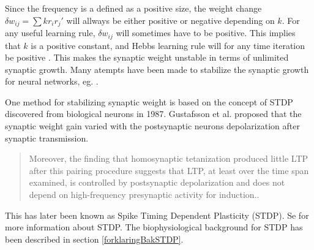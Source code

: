 Since the frequency is a defined as a positive size, the weight change $\delta w_{ij} = \sum{k r_i r_j'}$ will allways be either positive or negative depending on $k$. 
For any useful learning rule, $\delta w_{ij}$ will sometimes have to be positive. This implies that $k$ is a positive constant, and Hebbs learning rule will for any time iteration be positive
 . This makes the synaptic weight unstable in terms of unlimited synaptic growth.
Many atempts have been made to stabilize the synaptic growth for neural networks, eg. \cite{hebbUstabilt}. %

One method for stabilizing synaptic weight is based on the concept of STDP discovered from biological neurons in 1987.
Gustafsson et al. proposed that the synaptic weight gain varied with the postsynaptic neurons depolarization after synaptic transmission\cite{Gustafsson03011987}. 
\begin{quote}
Moreover, the finding that homosynaptic tetanization produced little LTP after this pairing procedure suggests that LTP, at least over the time span examined, is controlled by postsynaptic depolarization and does not depend on high-frequency presynaptic activity for induction.\cite{Gustafsson03011987}.
\end{quote}
This has later been known as Spike Timing Dependent Plasticity (STDP). Se \cite{reviewSTDP} for more information about STDP. The biophysiological background for STDP has been described in section \ref{forklaringBakSTDP}.


